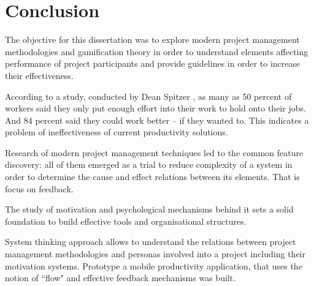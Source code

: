 \chapter*{Conclusion}

The objective for this dissertation was to explore modern project management methodologies and gamification theory in order to understand elements affecting performance of project participants and provide guidelines in order to increase their effectiveness.

According to a study, conducted by Dean Spitzer \cite{spitzer}, as many as 50 percent of workers said they only put enough effort into their work to hold onto their jobs. And 84 percent said they could work better -- if they wanted to. This indicates a problem of ineffectiveness of current productivity solutions.

Research of modern project management techniques led to the common feature discovery: all of them emerged as a trial to reduce complexity of a system in order to determine the cause and effect relations between its elements. That is focus on feedback.

The study of motivation and psychological mechanisms behind it sets a solid foundation to build effective tools and organisational structures.

System thinking approach allows to understand the relations between project management methodologies and personas involved into a project including their motivation systems. Prototype a mobile productivity application, that uses the notion of ``flow" and effective feedback mechanisms was built.